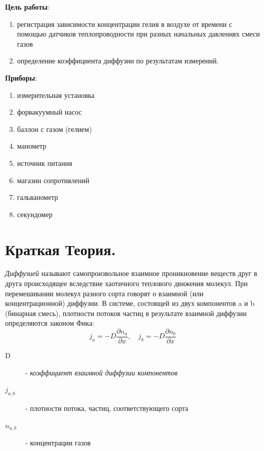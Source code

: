 \documentclass[a4paper,12pt]{article}
\numberwithin{equation}{section}
\begin{document}

\tableofcontents
\listoffigures
\listoftables

\newpage

\textbf{Цель работы}:
\begin{enumerate}
  \item регистрация зависимости концентрации гелия в воздухе от времени с помощью датчиков теплопроводности при разных начальных давлениях смеси газов
  \item определение коэффициента диффузии по результатам измерений.
\end{enumerate}

\textbf{Приборы}:
\begin{enumerate}
  \item измерительная установка
  \item форвакуумный насос
  \item баллон с газом (гелием)
  \item манометр
  \item источник питания
  \item магазин сопротивлений
  \item гальванометр
  \item секундомер
\end{enumerate}

\section{Краткая Теория.}
\textit{Диффузией}  называют самопроизвольное взаимное проникновение веществ друг в друга происходящее вследствие хаотичного теплового движения молекул. При перемешивании молекул разного сорта говорят о взаимной (или концентрационной) диффузии. В системе, состоящей из двух компонентов a и b (бинарная смесь), плотности потоков частиц в результате взаимной диффузии определяются законом Фика:
\begin{equation}
  j_a = -D \frac{\partial n_a}{\partial x}, \quad j_b = -D \frac{\partial n_b}{\partial x}
\end{equation}

\begin{description}
  \item[D] - \textit{коэффициент взаимной диффузии компонентов}
  \item[$j_{a, b}$] - плотности потока, частиц, соответствующего сорта
  \item[$n_{a, b}$] - концентрации газов
\end{description}
\end{document}
